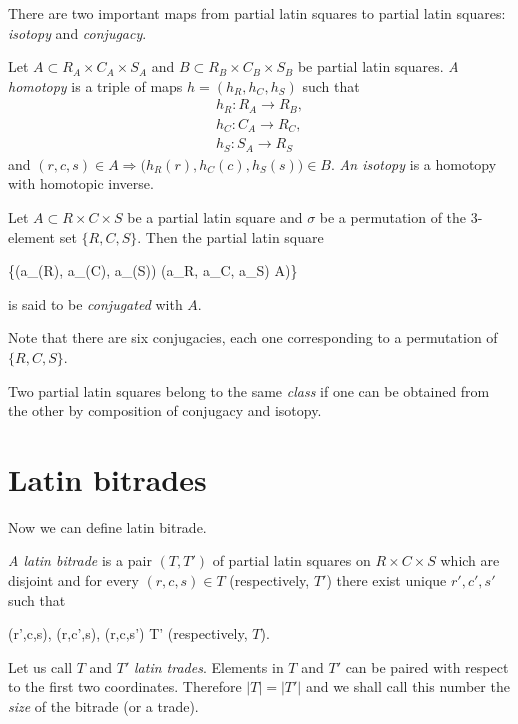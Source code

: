 There are two important maps from partial latin squares to partial latin squares: \emph{isotopy} and \emph{conjugacy}.

\begin{defn}
Let $A \subset R_A \times C_A \times S_A$ and $B \subset R_B \times C_B \times S_B$ be partial latin squares. \emph{A homotopy} is a triple of maps $h = (h_R, h_C, h_S)$ such that
\begin{eqnarray}
	h_R : R_A \rightarrow R_B, \nonumber \\
	h_C : C_A \rightarrow R_C, \nonumber \\
	h_S : S_A \rightarrow R_S\phantom{..} \nonumber
\end{eqnarray}
and $(r,c,s) \in A \Rightarrow \big(h_R(r), h_C(c), h_S(s)\big) \in B$. \emph{An isotopy} is a homotopy with homotopic inverse.
\end{defn}


\begin{defn}
Let $A \subset R \times C \times S$ be a partial latin square and $\sigma$ be a permutation of the 3-element set $\{R,C,S\}$. Then the partial latin square
\begin{cosyeqnarray}
	\{(a_{\sigma(R)}, a_{\sigma(C)}, a_{\sigma(S)}) \mid (a_R, a_C, a_S) \in A)\}
\end{cosyeqnarray}
is said to be \emph{conjugated} with $A$.
\end{defn}

Note that there are six conjugacies, each one corresponding to a permutation of $\{R,C,S\}$.

\begin{defn}
Two partial latin squares belong to the same \emph{class} if one can be obtained from the other by composition of conjugacy and isotopy.
\end{defn}


\section{Latin bitrades}

Now we can define latin bitrade.

\begin{defn}
\emph{A latin bitrade} is a pair $(T, T')$ of partial latin squares on $R \times C \times S$ which are disjoint and for every $(r,c,s) \in T$ (respectively, $T'$) there exist unique $r', c', s'$ such that
\begin{cosyeqnarray}
	(r',c,s), (r,c',s), (r,c,s') \in T' \textrm{ (respectively, $T$)}.
\end{cosyeqnarray}%
Let us call $T$ and $T'$ \emph{latin trades}. Elements in $T$ and $T'$ can be paired with respect to the first two coordinates. Therefore $|T| = |T'|$ and we shall call this number the \emph{size} of the bitrade (or a trade).
\end{defn}

